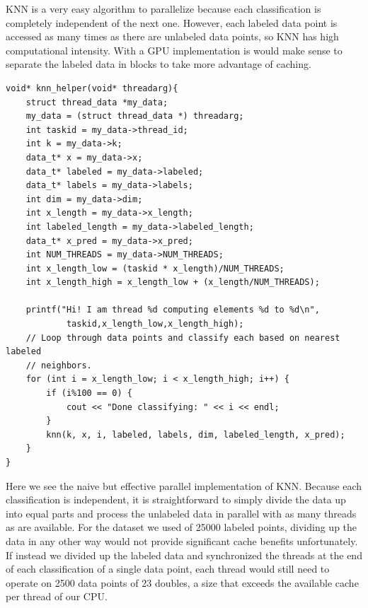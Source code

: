 \documentclass{article}
\begin{document}
KNN is a very easy algorithm to parallelize because each classification is completely independent of the next one. However, each labeled data point is accessed as many times as there are unlabeled data points, so KNN has high computational intensity. With a GPU implementation is would make sense to separate the labeled data in blocks to take more advantage of caching.
\begin{verbatim}
void* knn_helper(void* threadarg){
    struct thread_data *my_data;
    my_data = (struct thread_data *) threadarg;
    int taskid = my_data->thread_id;
    int k = my_data->k;
    data_t* x = my_data->x;
    data_t* labeled = my_data->labeled;
    data_t* labels = my_data->labels;
    int dim = my_data->dim;
    int x_length = my_data->x_length;
    int labeled_length = my_data->labeled_length;
    data_t* x_pred = my_data->x_pred;
    int NUM_THREADS = my_data->NUM_THREADS;
    int x_length_low = (taskid * x_length)/NUM_THREADS;
    int x_length_high = x_length_low + (x_length/NUM_THREADS);

    printf("Hi! I am thread %d computing elements %d to %d\n",
            taskid,x_length_low,x_length_high);
    // Loop through data points and classify each based on nearest labeled
    // neighbors.
    for (int i = x_length_low; i < x_length_high; i++) {
        if (i%100 == 0) {
            cout << "Done classifying: " << i << endl;
        }
        knn(k, x, i, labeled, labels, dim, labeled_length, x_pred);
    }
}
\end{verbatim}
Here we see the naive but effective parallel implementation of KNN. Because each classification is independent, it is straightforward to simply divide the data up into equal parts and process the unlabeled data in parallel with as many threads as are available. For the dataset we used of 25000 labeled points, dividing up the data in any other way would not provide significant cache benefits unfortunately. If instead we divided up the labeled data and synchronized the threads at the end of each classification of a single data point, each thread would still need to operate on 2500 data points of 23 doubles, a size that exceeds the available cache per thread of our CPU.
\clearpage
\end{document}
